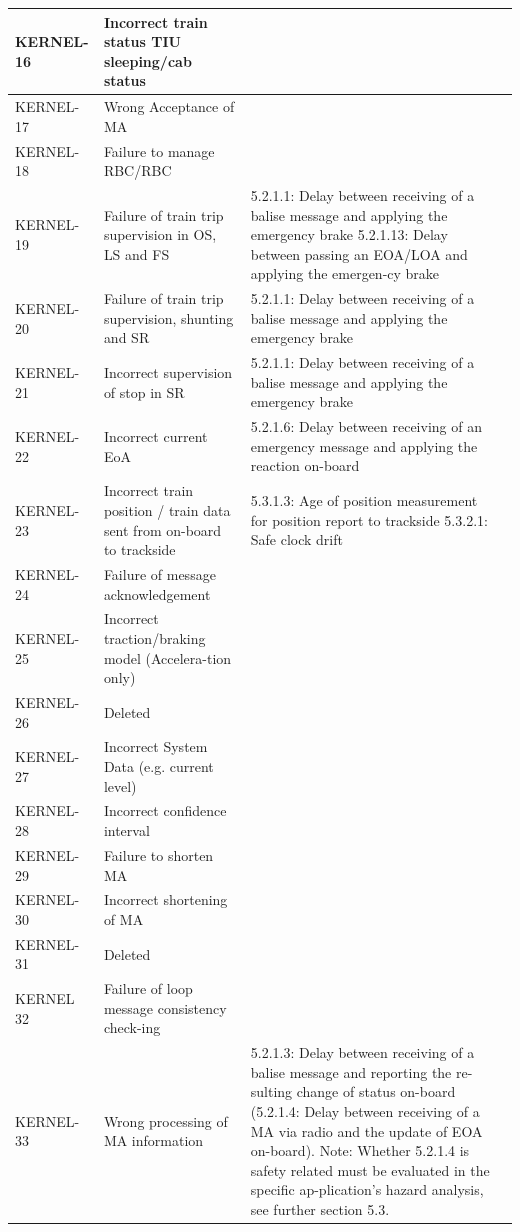 \documentclass{template/openetcs_report}
\begin{document}
\begin{center}
\begin{supertabular}[H]{|p{2cm}|p{4cm}|p{4cm}|p{4cm}|}
\hline KERNEL-16 & Incorrect train status TIU sleeping/cab status &  &  \\ 
\hline KERNEL-17 & Wrong Acceptance of MA &  &  \\ 
\hline KERNEL-18 & Failure to manage RBC/RBC &  &  \\ 
\hline KERNEL-19 & Failure of train trip supervision in OS, LS and FS & 
5.2.1.1: Delay between receiving of a balise message and applying the emergency brake
5.2.1.13: Delay between passing an EOA/LOA and applying the emergen-cy brake  &  \\
\hline KERNEL-20 & Failure of train trip supervision, shunting and SR & 
5.2.1.1: Delay between receiving of a balise message and applying the emergency brake &  \\ 
\hline KERNEL-21 & Incorrect supervision of stop in SR & 
5.2.1.1: Delay between receiving of a balise message and applying the emergency brake &  \\ 
\hline KERNEL-22 & Incorrect current EoA & 
5.2.1.6: Delay between receiving of an emergency message and applying the reaction on-board &  \\ 
\hline KERNEL-23 & Incorrect train position / train data sent from on-board to trackside & 
5.3.1.3: Age of position measurement for position report to trackside
5.3.2.1: Safe clock drift &  \\ 
\hline KERNEL-24 & Failure of message acknowledgement &  &  \\ 
\hline KERNEL-25 & Incorrect traction/braking model (Accelera-tion only) &  &  \\ 
\hline KERNEL-26 & Deleted &  &  \\ 
\hline KERNEL-27 & Incorrect System Data (e.g. current level) &  &  \\ 
\hline KERNEL-28 & Incorrect confidence interval &  &  \\ 
\hline KERNEL-29 & Failure to shorten MA &  &  \\ 
\hline KERNEL-30 & Incorrect shortening of MA &  &  \\ 
\hline KERNEL-31 & Deleted &  &  \\ 
\hline KERNEL 32 & Failure of loop message consistency check-ing &  &  \\ 
\hline KERNEL-33 & Wrong processing of MA information  & 5.2.1.3: Delay between receiving of a balise message and reporting the re-sulting change of status on-board
(5.2.1.4: Delay between receiving of a MA via radio and the update of EOA on-board).
Note: Whether 5.2.1.4 is safety related must be evaluated in the specific ap-plication’s hazard analysis, see further section 5.3.  &  \\

\end{supertabular}
\end{center}
\end{document}
